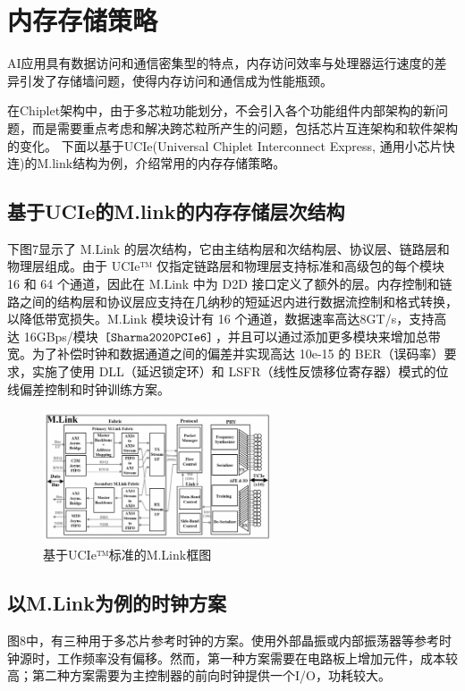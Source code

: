 \section{内存存储策略}

AI应用具有数据访问和通信密集型的特点，内存访问效率与处理器运行速度的差异引发了存储墙问题，使得内存访问和通信成为性能瓶颈。

在Chiplet架构中，由于多芯粒功能划分，不会引入各个功能组件内部架构的新问题，而是需要重点考虑和解决跨芯粒所产生的问题，包括芯片互连架构和软件架构的变化。
下面以基于UCIe(Universal Chiplet Interconnect Express, 通用小芯片快连)的M.link结构为例，介绍常用的内存存储策略。

\subsection{基于UCIe的M.link的内存存储层次结构}

下图7显示了 M.Link 的层次结构，它由主结构层和次结构层、协议层、链路层和物理层组成。由于 UCIe™ 仅指定链路层和物理层支持标准和高级包的每个模块 16 和 64 个通道，因此在 M.Link 中为 D2D 接口定义了额外的层。内存控制和链路之间的结构层和协议层应支持在几纳秒的短延迟内进行数据流控制和格式转换，以降低带宽损失。M.Link 模块设计有 16 个通道，数据速率高达8GT/s，支持高达 16GBps/模块 $\texttt{\cite{Sharma2020PCIe6}}$，并且可以通过添加更多模块来增加总带宽。为了补偿时钟和数据通道之间的偏差并实现高达 10e-15 的 BER（误码率）要求，实施了使用 DLL（延迟锁定环）和 LSFR（线性反馈移位寄存器）模式的位线偏差控制和时钟训练方案。

\begin{figure}[htbp]
	\centering
	\includegraphics[width=0.6\textwidth]{img/4-1.png} %
	\caption{基于UCIe™标准的M.Link框图 \cite{10848977}}
	\label{fig:example}
\end{figure}

\subsection{以M.Link为例的时钟方案}
图8中，有三种用于多芯片参考时钟的方案。使用外部晶振或内部振荡器等参考时钟源时，工作频率没有偏移。然而，第一种方案需要在电路板上增加元件，成本较高；第二种方案需要为主控制器的前向时钟提供一个I/O，功耗较大。

